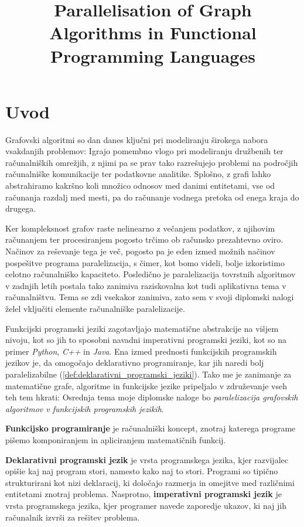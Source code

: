 \documentclass[mat1, tisk]{fmfdelo}
\title{Parallelisation of Graph Algorithms in Functional Programming Languages}
\begin{document}
\section{Uvod}

Grafovski algoritmi so dan danes ključni pri modeliranju širokega nabora vsakdanjih problemov: 
Igrajo pomembno vlogo pri modeliranju družbenih ter računalniških omrežjih, z njimi pa se prav tako razrešujejo 
problemi na področjih računalniške komunikacije ter podatkovne analitike. Splošno, z grafi lahko abstrahiramo kakršno 
koli množico odnosov med danimi entitetami, vse od računanja razdalj med mesti, pa do računanje vodnega pretoka 
od enega kraja do drugega.

Ker kompleksnost grafov raste nelinearno z večanjem podatkov, z njihovim računanjem ter procesiranjem pogosto trčimo
ob računsko prezahtevno oviro. Načinov za reševanje tega je več, pogosto pa je eden izmed možnih načinov pospešitve
programa paralelizacija, s čimer, kot bomo videli, bolje izkoristimo celotno računalniško kapaciteto.
Posledično je paralelizacija tovrstnih algoritmov v zadnjih letih postala tako zanimiva raziskovalna kot
tudi aplikativna tema v računalništvu.  Tema se zdi vsekakor zanimiva, zato sem v svoji diplomski nalogi želel 
vključiti elemente računalniške paralelizacije.

Funkcijski programski jeziki zagotavljajo matematične abstrakcije na višjem nivoju, kot so jih to sposobni navadni
imperativni programski jeziki, kot so na primer \textit{Python}, \textit{C++} in \textit{Java}. 
Ena izmed prednosti funkcijskih programskih jezikov je, da omogočajo deklarativno programiranje, 
kar jih naredi bolj paralelizabilne (\ref{def:deklarativni_programski_jeziki}). Tako me je zanimanje za matematične grafe, algoritme
in funkcijske jezike pripeljalo v združevanje vseh teh tem hkrati: Osrednja tema moje diplomske naloge bo
\textit{paralelizacija grafovskih algoritmov v funkcijskih programskih jezikih}.

\begin{definicija}
  \textbf{Funkcijsko programiranje} je računalniški koncept, znotraj katerega programe pišemo komponiranjem in apliciranjem matematičnih funkcij. 
\end{definicija}

\begin{definicija} \label{def:deklarativni_programski_jeziki}
  \textbf{Deklarativni programski jezik} je vrsta programskega jezika, kjer razvijalec opišie kaj naj program stori, 
  namesto kako naj to stori. Programi so tipično strukturirani kot nizi deklaracij, ki določajo razmerja in omejitve
  med različnimi entitetami znotraj problema. 
  Nasprotno, \textbf{imperativni programski jezik} je vrsta programskega jezika, kjer programer navede zaporedje ukazov,
  ki naj jih računalnik izvrši za rešitev problema.
\end{definicija}
\end{document}
